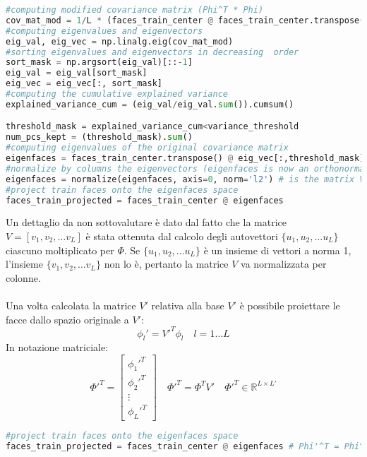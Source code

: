 \begin{lstlisting}[language=Python]
#computing modified covariance matrix (Phi^T * Phi)
cov_mat_mod = 1/L * (faces_train_center @ faces_train_center.transpose()) 
#computing eigenvalues and eigenvectors
eig_val, eig_vec = np.linalg.eig(cov_mat_mod)
#sorting eigenvalues and eigenvectors in decreasing  order
sort_mask = np.argsort(eig_val)[::-1]
eig_val = eig_val[sort_mask]
eig_vec = eig_vec[:, sort_mask]
#computing the cumulative explained variance
explained_variance_cum = (eig_val/eig_val.sum()).cumsum() 

threshold_mask = explained_variance_cum<variance_threshold
num_pcs_kept = (threshold_mask).sum()
#computing eigenvalues of the original covariance matrix
eigenfaces = faces_train_center.transpose() @ eig_vec[:,threshold_mask] 
#normalize by columns the eigenvectors (eigenfaces is now an orthonormal matrix)
eigenfaces = normalize(eigenfaces, axis=0, norm='l2') # is the matrix V'
#project train faces onto the eigenfaces space
faces_train_projected = faces_train_center @ eigenfaces
\end{lstlisting}

\noindent Un dettaglio da non sottovalutare è dato dal fatto che la matrice \(V = [v_1, v_2, \dots v_L]\) è stata ottenuta dal calcolo degli autovettori \(\{u_1, u_2, \dots u_L\}\) ciascuno moltiplicato per \(\Phi\). Se \(\{u_1, u_2, \dots u_L\}\) è un insieme di vettori a norma 1, l'insieme \(\{v_1, v_2,\dots v_L \}\) non lo è, pertanto la matrice \(V\) va normalizzata per colonne.
\\
\\
Una volta calcolata la matrice \(V'\) relativa alla base \(V'\) è possibile proiettare le facce dallo spazio originale a \(V'\):
\[
\phi_l' = V'^T\phi_l \quad l = 1 \dots L
\]
In notazione matriciale:
\[
    \Phi'^T = \begin{bmatrix}
        \phi_1'^T \\
        \phi_2'^T \\
        \vdots \\
        \phi_L'^T
    \end{bmatrix} \quad \Phi'^T = \Phi^T V'  \quad \Phi'^T \in \mathbb{R}^{L \times L'} 
\]
\begin{lstlisting}[language=Python]
#project train faces onto the eigenfaces space
faces_train_projected = faces_train_center @ eigenfaces # Phi'^T = Phi^T * V'
\end{lstlisting}